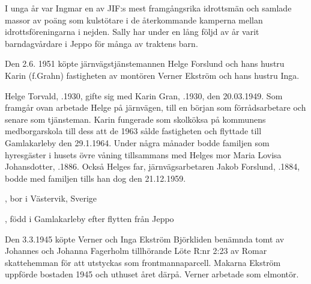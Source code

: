 I unga år var Ingmar en av JIF:s mest framgångsrika idrottsmän och samlade massor av poäng som kulstötare i de återkommande kamperna mellan idrottsföreningarna i nejden. Sally har under en lång följd av år varit barndagvårdare i Jeppo för många av traktens barn.
\begin{jhchildren}
  \item {}
  \item {}
  \item {}
  \item {}
  \item {}
\end{jhchildren}


Den 2.6. 1951 köpte järnvägstjänstemannen Helge Forslund och hans hustru Karin (f.Grahn) fastigheten av montören Verner Ekström och hans hustru Inga.

Helge Torvald, .1930, gifte sig med Karin Gran, .1930, den 20.03.1949. Som framgår ovan arbetade Helge på järnvägen, till en början som förrådsarbetare och senare som tjänsteman. Karin fungerade som skolköksa på kommunens medborgarskola till dess att de 1963 sålde fastigheten och flyttade till Gamlakarleby den 29.1.1964. Under några månader bodde familjen som hyresgäster i husets övre våning tillsammans med Helges mor Maria Lovisa Johansdotter, .1886. Också Helges far, järnvägsarbetaren Jakob Forslund,  .1884, bodde med familjen tills han dog den 21.12.1959.
\begin{jhchildren}
  \item {}, bor i Västervik, Sverige
  \item {}
  \item {}
  \item {}, född i Gamlakarleby efter flytten från Jeppo
\end{jhchildren}


Den 3.3.1945 köpte Verner och Inga Ekström Björkliden benämnda tomt av Johannes och Johanna Fagerholm tillhörande Löte R:nr 2:23 av Romar skattehemman för att utstyckas som frontmannaparcell. Makarna Ekström uppförde bostaden 1945 och uthuset året därpå. Verner arbetade  som elmontör.



